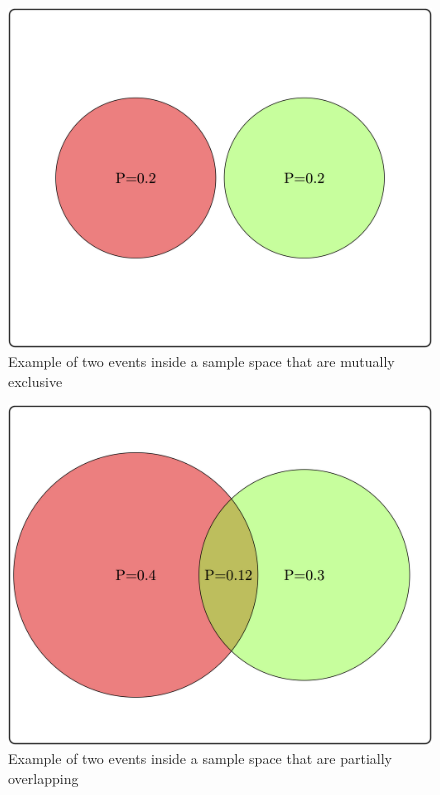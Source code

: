 \documentclass[
  letterpaper,
  DIV=11,
  numbers=noendperiod]{scrreprt}
\begin{document}
\begin{figure}

{\centering \includegraphics{./ch6/indep_ex1.png}

}

\caption{Example of two events inside a sample space that are mutually
exclusive}

\end{figure}

\begin{figure}

{\centering \includegraphics{./ch6/indep_ex2.png}

}

\caption{Example of two events inside a sample space that are partially
overlapping}

\end{figure}
\end{document}
